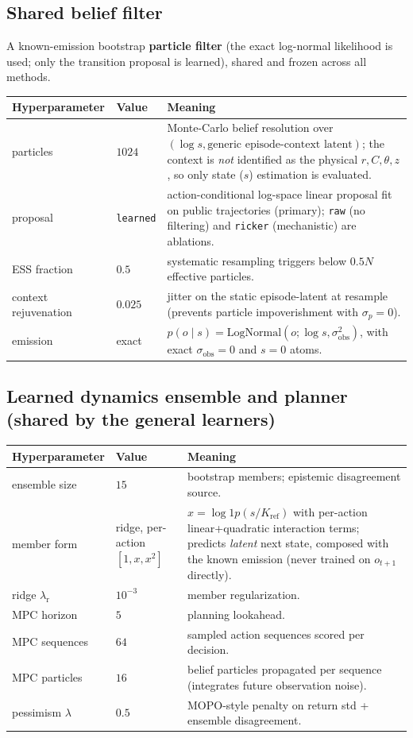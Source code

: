 \documentclass[11pt]{article}
\newcommand{\Kref}{K_{\mathrm{ref}}}
\newcommand{\sobs}{\sigma_{\mathrm{obs}}}
\begin{document}
\subsection{Shared belief filter}
A known-emission bootstrap \textbf{particle filter} (the exact log-normal
likelihood is used; only the transition proposal is learned), shared and frozen
across all methods.
\begin{longtable}{@{}p{3.6cm}p{2.4cm}p{8.0cm}@{}}
\toprule
Hyperparameter & Value & Meaning \\
\midrule
particles & $1024$ & Monte-Carlo belief resolution over $(\log s, \text{generic episode-context latent})$; the context is \emph{not} identified as the physical $r,C,\theta,z$, so only state ($s$) estimation is evaluated. \\
proposal & \texttt{learned} & action-conditional log-space linear proposal fit on public trajectories (primary); \texttt{raw} (no filtering) and \texttt{ricker} (mechanistic) are ablations. \\
ESS fraction & $0.5$ & systematic resampling triggers below $0.5N$ effective particles. \\
context rejuvenation & $0.025$ & jitter on the static episode-latent at resample (prevents particle impoverishment with $\sigma_p{=}0$). \\
emission & exact & $p(o\mid s)=\mathrm{LogNormal}(o;\log s,\sobs^2)$, with exact $\sobs{=}0$ and $s{=}0$ atoms. \\
\bottomrule
\end{longtable}

\subsection{Learned dynamics ensemble and planner (shared by the general learners)}
\begin{longtable}{@{}p{3.6cm}p{2.4cm}p{8.0cm}@{}}
\toprule
Hyperparameter & Value & Meaning \\
\midrule
ensemble size & $15$ & bootstrap members; epistemic disagreement source. \\
member form & ridge, per-action $[1,x,x^2]$ & $x{=}\log1p(s/\Kref)$ with per-action linear+quadratic interaction terms; predicts \emph{latent} next state, composed with the known emission (never trained on $o_{t+1}$ directly). \\
ridge $\lambda_{\mathrm{r}}$ & $10^{-3}$ & member regularization. \\
MPC horizon & $5$ & planning lookahead. \\
MPC sequences & $64$ & sampled action sequences scored per decision. \\
MPC particles & $16$ & belief particles propagated per sequence (integrates future observation noise). \\
pessimism $\lambda$ & $0.5$ & MOPO-style penalty on return std + ensemble disagreement. \\
\bottomrule
\end{longtable}
\end{document}
